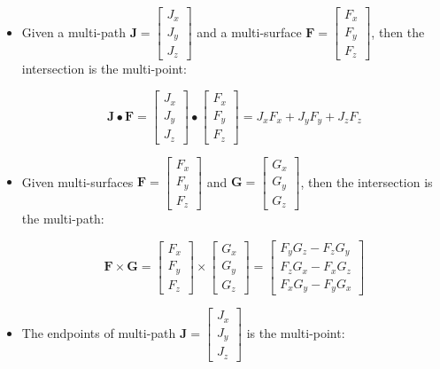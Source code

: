 \documentclass{book}
\begin{document}
\begin{itemize}
\item Given a multi-path \(\mathbf{J} = \begin{bmatrix} J_x \\ J_y \\ J_z \end{bmatrix}\) and a multi-surface \(\mathbf{F} = \begin{bmatrix} F_x \\ F_y \\ F_z \end{bmatrix}\), then the intersection is the multi-point:

\[\mathbf{J} \bullet \mathbf{F} = \begin{bmatrix} J_x \\ J_y \\ J_z \end{bmatrix} \bullet \begin{bmatrix} F_x \\ F_y \\ F_z \end{bmatrix} = J_x F_x + J_y F_y + J_z F_z\]
\item Given multi-surfaces \(\mathbf{F} = \begin{bmatrix} F_x \\ F_y \\ F_z \end{bmatrix}\) and \(\mathbf{G} = \begin{bmatrix} G_x \\ G_y \\ G_z \end{bmatrix}\), then the intersection is the multi-path:

\[\mathbf{F} \times \mathbf{G} = \begin{bmatrix} F_x \\ F_y \\ F_z \end{bmatrix} \times \begin{bmatrix} G_x \\ G_y \\ G_z \end{bmatrix}
 = \begin{bmatrix} F_y G_z - F_z G_y \\ F_z G_x - F_x G_z \\ F_x G_y - F_y G_x \end{bmatrix}\]
\item The endpoints of multi-path \(\mathbf{J} = \begin{bmatrix} J_x \\ J_y \\ J_z \end{bmatrix}\) is the multi-point:


\end{itemize}
\end{document}
